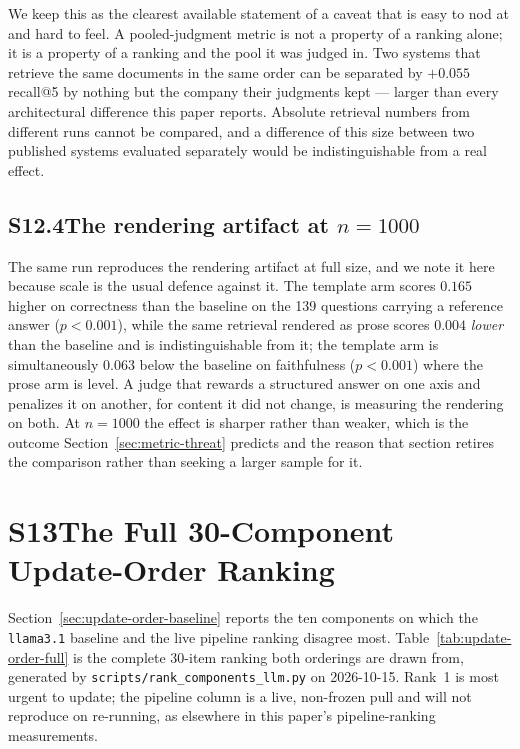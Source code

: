 \documentclass[acmsmall,anonymous,screen]{acmart}
\begin{document}
We keep this as the clearest available statement of a caveat that is easy to
nod at and hard to feel. A pooled-judgment metric is not a property of a
ranking alone; it is a property of a ranking and the pool it was judged in. Two
systems that retrieve the same documents in the same order can be separated by
$+0.055$ recall@5 by nothing but the company their judgments kept --- larger
than every architectural difference this paper reports. Absolute retrieval
numbers from different runs cannot be compared, and a difference of this size
between two published systems evaluated separately would be indistinguishable
from a real effect.

\subsection*{S12.4\quad The rendering artifact at $n=1000$}
The same run reproduces the rendering artifact at full size, and we note it here
because scale is the usual defence against it. The template arm scores $0.165$
higher on correctness than the baseline on the 139 questions carrying a
reference answer ($p<0.001$), while the same retrieval rendered as prose scores
$0.004$ \emph{lower} than the baseline and is indistinguishable from it; the
template arm is simultaneously $0.063$ below the baseline on faithfulness
($p<0.001$) where the prose arm is level. A judge that rewards a structured
answer on one axis and penalizes it on another, for content it did not change,
is measuring the rendering on both. At $n=1000$ the effect is sharper rather
than weaker, which is the outcome Section~\ref{sec:metric-threat} predicts and
the reason that section retires the comparison rather than seeking a larger
sample for it.

\section*{S13\quad The Full 30-Component Update-Order Ranking}
Section~\ref{sec:update-order-baseline} reports the ten components on which
the \texttt{llama3.1} baseline and the live pipeline ranking disagree most.
Table~\ref{tab:update-order-full} is the complete 30-item ranking both
orderings are drawn from, generated by
\texttt{scripts/rank\_components\_llm.py} on 2026-10-15. Rank~1 is most
urgent to update; the pipeline column is a live, non-frozen pull and will not
reproduce on re-running, as elsewhere in this paper's pipeline-ranking
measurements.
\end{document}
